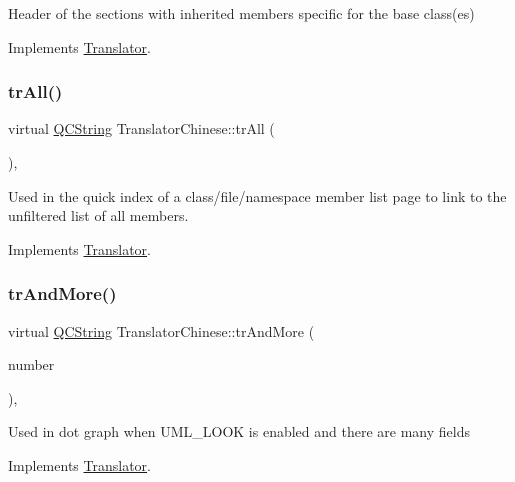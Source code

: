 Header of the sections with inherited members specific for the base class(es) 

Implements \mbox{\hyperlink{class_translator}{Translator}}.

\mbox{\label{class_translator_chinese_afd2eb843c56e0fe445ca53aaaf839c89}} 
\subsubsection{\texorpdfstring{trAll()}{trAll()}}
{\footnotesize\ttfamily virtual \mbox{\hyperlink{class_q_c_string}{Q\+C\+String}} Translator\+Chinese\+::tr\+All (\begin{DoxyParamCaption}{ }\end{DoxyParamCaption})\hspace{0.3cm}{\ttfamily [inline]}, {\ttfamily [virtual]}}

Used in the quick index of a class/file/namespace member list page to link to the unfiltered list of all members. 

Implements \mbox{\hyperlink{class_translator}{Translator}}.

\mbox{\label{class_translator_chinese_a2fe16181d57a63bf65b59900e92dd434}} 
\subsubsection{\texorpdfstring{trAndMore()}{trAndMore()}}
{\footnotesize\ttfamily virtual \mbox{\hyperlink{class_q_c_string}{Q\+C\+String}} Translator\+Chinese\+::tr\+And\+More (\begin{DoxyParamCaption}\item[{const \mbox{\hyperlink{class_q_c_string}{Q\+C\+String}} \&}]{number }\end{DoxyParamCaption})\hspace{0.3cm}{\ttfamily [inline]}, {\ttfamily [virtual]}}

Used in dot graph when U\+M\+L\+\_\+\+L\+O\+OK is enabled and there are many fields 

Implements \mbox{\hyperlink{class_translator}{Translator}}.

\mbox{\label{class_translator_chinese_a315ef35cadecda32032f4436150ff058}} 
